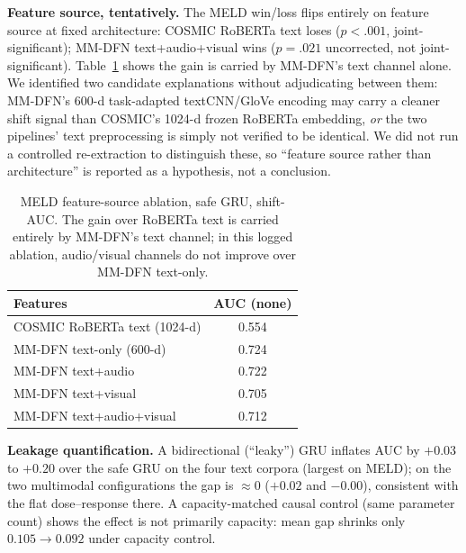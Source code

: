 \documentclass[conference]{IEEEtran}
\begin{document}
\textbf{Feature source, tentatively.} The MELD win/loss flips entirely on feature source at fixed
architecture: COSMIC RoBERTa text loses ($p<.001$, joint-significant); MM-DFN text+audio+visual
wins ($p=.021$ uncorrected, not joint-significant). Table~\ref{tab:feat} shows the gain is carried
by MM-DFN's text channel alone. We identified two candidate explanations without adjudicating
between them: MM-DFN's 600-d task-adapted textCNN/GloVe encoding may carry a cleaner shift signal
than COSMIC's 1024-d frozen RoBERTa embedding, \emph{or} the two pipelines' text preprocessing is
simply not verified to be identical. We did not run a controlled re-extraction to distinguish
these, so ``feature source rather than architecture'' is reported as a hypothesis, not a
conclusion.

\begin{table}[t]
\centering
\footnotesize
\caption{MELD feature-source ablation, safe GRU, shift-AUC. The gain over RoBERTa text is carried
entirely by MM-DFN's text channel; in this logged ablation, audio/visual channels do not
improve over MM-DFN text-only.}
\label{tab:feat}
\begin{tabular}{lc}
\toprule
Features & AUC (none) \\
\midrule
COSMIC RoBERTa text (1024-d) & 0.554 \\
MM-DFN text-only (600-d)     & 0.724 \\
MM-DFN text+audio            & 0.722 \\
MM-DFN text+visual           & 0.705 \\
MM-DFN text+audio+visual     & 0.712 \\
\bottomrule
\end{tabular}
\end{table}

\textbf{Leakage quantification.} A bidirectional (``leaky'') GRU inflates AUC by $+0.03$ to $+0.20$
over the safe GRU on the four text corpora (largest on MELD); on the two multimodal configurations
the gap is $\approx$0 ($+0.02$ and $-0.00$), consistent with the flat dose--response there. A
capacity-matched causal control (same parameter count) shows the effect is not primarily capacity:
mean gap shrinks only $0.105{\to}0.092$ under capacity control.
\end{document}
